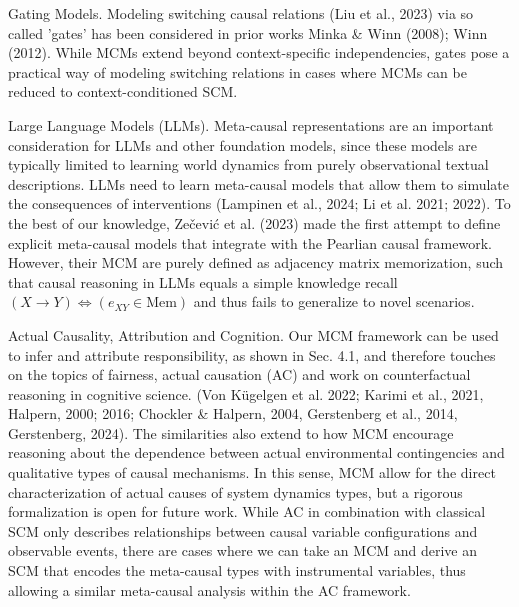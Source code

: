 \documentclass[10pt]{article}
\begin{document}
Gating Models. Modeling switching causal relations (Liu et al., 2023) via so called 'gates' has been considered in prior works Minka \& Winn (2008); Winn (2012). While MCMs extend beyond context-specific independencies, gates pose a practical way of modeling switching relations in cases where MCMs can be reduced to context-conditioned SCM.

Large Language Models (LLMs). Meta-causal representations are an important consideration for LLMs and other foundation models, since these models are typically limited to learning world dynamics from purely observational textual descriptions. LLMs need to learn meta-causal models that allow them to simulate the consequences of interventions (Lampinen et al., 2024; Li et al. 2021; 2022). To the best of our knowledge, Zečević et al. (2023) made the first attempt to define explicit meta-causal models that integrate with the Pearlian causal framework. However, their MCM are purely defined as adjacency matrix memorization, such that causal reasoning in LLMs equals a simple knowledge recall $(X \rightarrow Y) \Leftrightarrow\left(e_{X Y} \in \mathrm{Mem}\right)$ and thus fails to generalize to novel scenarios.

Actual Causality, Attribution and Cognition. Our MCM framework can be used to infer and attribute responsibility, as shown in Sec. 4.1, and therefore touches on the topics of fairness, actual causation (AC) and work on counterfactual reasoning in cognitive science. (Von Kügelgen et al. 2022; Karimi et al., 2021, Halpern, 2000; 2016; Chockler \& Halpern, 2004, Gerstenberg et al., 2014, Gerstenberg, 2024). The similarities also extend to how MCM encourage reasoning about the dependence between actual environmental contingencies and qualitative types of causal mechanisms. In this sense, MCM allow for the direct characterization of actual causes of system dynamics types, but a rigorous formalization is open for future work. While AC in combination with classical SCM only describes relationships between causal variable configurations and observable events, there are cases where we can take an MCM and derive an SCM that encodes the meta-causal types with instrumental variables, thus allowing a similar meta-causal analysis within the AC framework.
\end{document}
